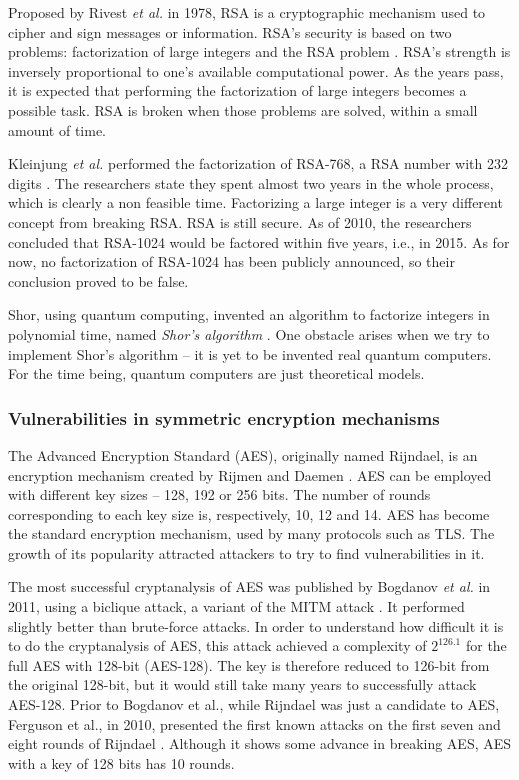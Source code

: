 \documentclass{sig-alternate-05-2015}
\begin{document}
Proposed by Rivest \textit{et al.} in 1978, RSA is a cryptographic mechanism used to cipher and sign messages or information. RSA's security is based on two problems: factorization of large integers and the RSA problem \cite{Menezes1996}. RSA's strength is inversely proportional to one's available computational power. As the years pass, it is expected that performing the factorization of large integers becomes a possible task.
RSA is broken when those problems are solved, within a small amount of time.

Kleinjung \textit{et al.} performed the factorization of RSA-768, a RSA number with 232 digits \cite{Kleinjung2010}. The researchers state they spent almost two years in the whole process, which is clearly a non feasible time.
Factorizing a large integer is a very different concept from breaking RSA. RSA is still secure.
As of 2010, the researchers concluded that RSA-1024 would be factored within five years, i.e., in 2015. As for now, no factorization of RSA-1024 has been publicly announced, so their conclusion proved to be false.

Shor, using quantum computing, invented an algorithm to factorize integers in polynomial time, named \textit{Shor's algorithm} \cite{Shor1995}. One obstacle arises when we try to implement Shor's algorithm -- it is yet to be invented real quantum computers. For the time being, quantum computers are just theoretical models.

\subsubsection{Vulnerabilities in symmetric encryption mechanisms}

The Advanced Encryption Standard (AES), originally named Rijndael, is an encryption mechanism created by Rijmen and Daemen \cite{Rijmen2001}. AES can be employed with different key sizes -- 128, 192 or 256 bits. The number of rounds corresponding to each key size is, respectively, 10, 12 and 14.
AES has become the standard encryption mechanism, used by many protocols such as TLS. The growth of its popularity attracted attackers to try to find vulnerabilities in it.

The most successful cryptanalysis of AES was published by Bogdanov \textit{et al.} in 2011, using a biclique attack, a variant of the MITM attack \cite{Bogdanov2011}. It performed slightly better than brute-force attacks. In order to understand how difficult it is to do the cryptanalysis of AES, this attack achieved a complexity of $2^{126.1}$ for the full AES with 128-bit (AES-128). The key is therefore reduced to 126-bit from the original 128-bit, but it would still take many years to successfully attack AES-128.
Prior to Bogdanov et al., while Rijndael was just a candidate to AES, Ferguson et al., in 2010, presented the first known attacks on the first seven and eight rounds of Rijndael \cite{Ferguson2001}. Although it shows some advance in breaking AES, AES with a key of 128 bits has 10 rounds.
\end{document}
